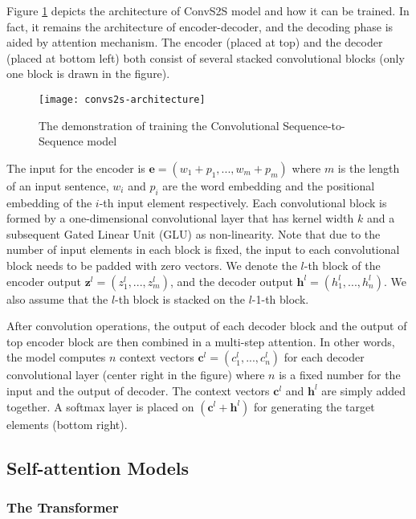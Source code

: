 Figure \ref{figure:convs2s model} depicts the architecture of ConvS2S model and how it can be trained. In fact, it remains the architecture of encoder-decoder, and the decoding phase is aided by attention mechanism. The encoder (placed at top) and the decoder (placed at bottom left) both consist of several stacked convolutional blocks (only one block is drawn in the figure).
\begin{figure}[h]
\texttt{[image: convs2s-architecture]}
\centering
\caption{The demonstration of training the Convolutional Sequence-to-Sequence model \cite{gehring2017convs2s}}
\label{figure:convs2s model}
\end{figure}
The input for the encoder is $ \textbf{e} = (w_{1}+p_{1},...,w_{m}+p_{m}) $ where $ m $ is the length of an input sentence, $ w_{i} $ and $ p_{i} $ are the word embedding and the positional embedding of the $ i $-th input element respectively. Each convolutional block is formed by a one-dimensional convolutional layer that has kernel width $ k $ and a subsequent Gated Linear Unit (GLU) as non-linearity. Note that due to the number of input elements in each block is fixed, the input to each convolutional block needs to be padded with zero vectors. We denote the $ l $-th block of the encoder output $ \textbf{z}^{l} = (z_{1}^{l},...,z_{m}^{l}) $, and the decoder output $ \textbf{h}^{l} = (h_{1}^{l},...,h_{n}^{l}) $. We also assume that the $ l $-th block is stacked on the $ l $-1-th block. 

After convolution operations, the output of each decoder block and the output of top encoder block are then combined in a multi-step attention. In other words, the model computes $ n $ context vectors $ \textbf{c}^{l} = (c^{l}_{1},...,c^{l}_{n}) $ for each decoder convolutional layer (center right in the figure) where $ n $ is a fixed number for the input and the output of decoder. The context vectors $ \textbf{c}^{l} $ and $ \textbf{h}^{l} $ are simply added together. A softmax layer is placed on $ (\textbf{c}^{l} + \textbf{h}^{l}) $ for generating the target elements (bottom right).



\subsection{Self-attention Models}

\subsubsection*{The Transformer}

